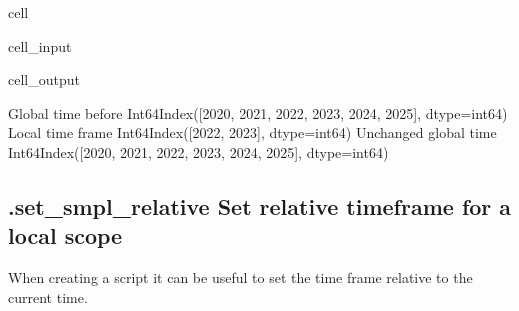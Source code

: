 \documentclass[letterpaper,10pt,english]{jupyterBook}
\begin{document}
\begin{sphinxuseclass}{cell}\begin{sphinxVerbatimInput}

\begin{sphinxuseclass}{cell_input}
\begin{sphinxVerbatim}[commandchars=\\\{\}]
 
\end{sphinxVerbatim}

\end{sphinxuseclass}\end{sphinxVerbatimInput}
\begin{sphinxVerbatimOutput}

\begin{sphinxuseclass}{cell_output}
\begin{sphinxVerbatim}[commandchars=\\\{\}]
Global time  before   Int64Index([2020, 2021, 2022, 2023, 2024, 2025], dtype=\PYGZsq{}int64\PYGZsq{})
Local time frame      Int64Index([2022, 2023], dtype=\PYGZsq{}int64\PYGZsq{})
Unchanged global time Int64Index([2020, 2021, 2022, 2023, 2024, 2025], dtype=\PYGZsq{}int64\PYGZsq{})
\end{sphinxVerbatim}

\end{sphinxuseclass}\end{sphinxVerbatimOutput}

\end{sphinxuseclass}

\subsection{.set\_smpl\_relative Set relative timeframe for a local scope}
\label{\detokenize{content/Python/modelflow_features:set-smpl-relative-set-relative-timeframe-for-a-local-scope}}
\sphinxAtStartPar
When creating a script it can be useful to set the time frame relative to the
current time.
\end{document}
